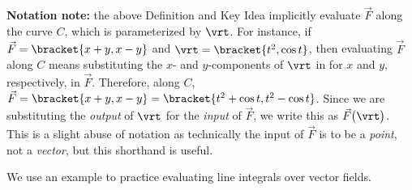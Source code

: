 \textbf{Notation note:} the above Definition and Key Idea implicitly evaluate $\vec F$ along the curve $C$, which is parameterized by $\vrt$. For instance, if $\vec F =\bracket{x+y,x-y}$ and $\vrt =\bracket{t^2,\cos t}$, then evaluating $\vec F$ along $C$ means substituting the $x$- and $y$-components of $\vrt$ in for $x$ and $y$, respectively, in $\vec F$. Therefore, along $C$, $\vec F =\bracket{x+y,x-y}=\bracket{t^2+\cos t,t^2-\cos t}$. Since we are substituting the \emph{output} of $\vrt$ for the \emph{input} of $\vec F$, we write this as $\vec F\big(\vrt\big)$. This is a slight abuse of notation as technically the input of $\vec F$ is to be a \emph{point}, not a \emph{vector}, but this shorthand is useful.

We use an example to practice evaluating line integrals over vector fields.


